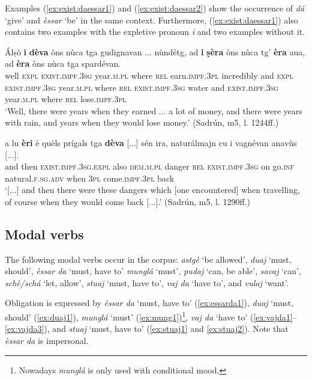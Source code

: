 Examples (\ref{ex:exist:daessar1}) and (\ref{ex:exist:daessar2}) show the occurrence of \textit{dá} `give' and \textit{èssar} `be' in the same context. Furthermore, (\ref{ex:exist:daessar1}) also contains two examples with the expletive pronoun \textit{i} and two examples without it.

\ea
\label{ex:exist:daessar1}
\gll Álṣò \textbf{i} \textbf{dèva} òns nùca tga gudignavan ... nùndétg, ad \textbf{i} \textbf{ṣèra} òns nùca tg’ \textbf{èra} aua, ad \textbf{èra} òns nùca tga spardévan.\\
well \textsc{expl} \textsc{exist.impf.3sg} year.\textsc{m.pl} where \textsc{rel} earn.\textsc{impf.3pl} {} incredibly and \textsc{expl} \textsc{exist.impf.3sg} year.\textsc{m.pl} where \textsc{rel} \textsc{exist.impf.3sg} water and \textsc{exist.impf.3sg} year.\textsc{m.pl} where \textsc{rel} lose.\textsc{impf.3pl} \\
\glt `Well, there were years when they earned ... a lot of money, and there were years with rain, and years when they would lose money.' (Sadrún, m5, l. 1244ff.)
\z

\ea
\label{ex:exist:daessar2}
\gll [...] a lu \textbf{èri} è quèls prígals tga \textbf{dèva} [...] sén ira, naturálmajn cu i vagnévan anavùs [...].\\
{} and then \textsc{exist.impf.3sg.expl} also \textsc{dem.m.pl} danger \textsc{rel} \textsc{exist.impf.3sg} {} on go.\textsc{inf} natural.\textsc{f.sg.adv} when \textsc{3pl} come.\textsc{impf.3pl} back\\
\glt `[...] and then there were these dangers which [one encountered] when travelling, of course when they would come back [...].' (Sadrún, m5, l. 1290ff.)
\z


\subsection{Modal verbs}
The following modal verbs occur in the corpus: \textit{astgè} `be allowed', \textit{duaj} `must, should', \textit{èssar da} `must, have to' \textit{munglá} `must', \textit{pudaj} `can, be able', \textit{savaj} `can', \textit{schè/schá} `let, allow', \textit{stuaj} `must, have to', \textit{vaj da} `have to', and \textit{vulaj} `want'.

Obligation is expressed by \textit{èssar da} `must, have to' (\ref{ex:essarda1}), \textit{duaj} `must, should' (\ref{ex:duaj1}), \textit{munglá} `must' (\ref{ex:mung1})\footnote{Nowadays \textit{munglá} is only used with conditional mood.}, \textit{vaj da} `have to' (\ref{ex:vajda1}--\ref{ex:vajda3}), and \textit{stuaj} `must, have to' (\ref{ex:stuaj1} and \ref{ex:stuaj2}). Note that \textit{èssar da} is impersonal.

